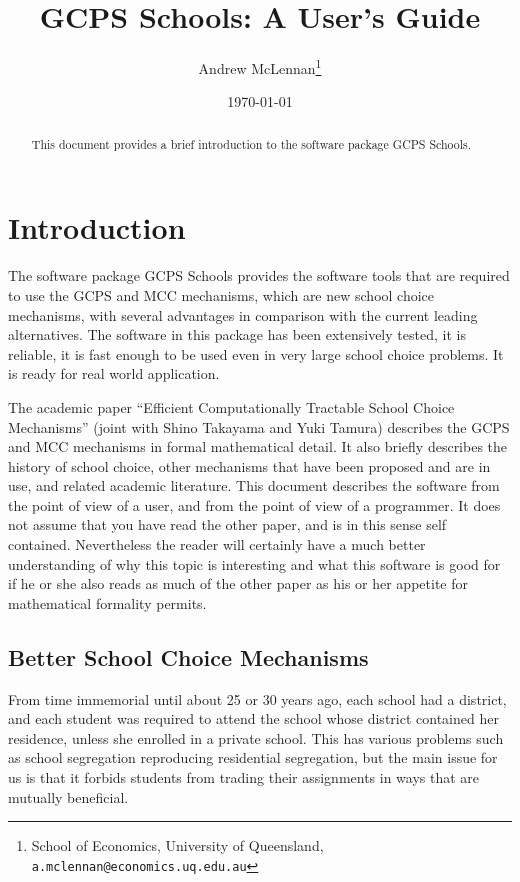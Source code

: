 \documentclass[12pt]{article}
\theoremstyle{definition}
\begin{document}
\title{GCPS Schools: A User's Guide}

\author{Andrew McLennan\footnote{School of Economics, University of
    Queensland, {\tt a.mclennan@economics.uq.edu.au}}}

\date{\today}

\maketitle

\begin{abstract}
This document provides a brief introduction to the software package GCPS Schools.
\end{abstract}


\section{Introduction}

The software package GCPS Schools provides the software tools that are
required to use the GCPS and MCC mechanisms, which are new school choice
mechanisms, with several advantages in comparison with the current
leading alternatives.  The software in this package has been
extensively tested, it is reliable, it is fast enough to be used even
in very large school choice problems.  It is ready for real world
application.

The academic paper ``Efficient Computationally Tractable School Choice
Mechanisms'' (joint with Shino Takayama and Yuki Tamura) describes the
GCPS and MCC mechanisms in formal mathematical detail.  It also
briefly describes the history of school choice, other mechanisms that
have been proposed and are in use, and related academic literature.
This document describes the software from the point of view of a user,
and from the point of view of a programmer.  It does not assume that
you have read the other paper, and is in this sense self contained.
Nevertheless the reader will certainly have a much better
understanding of why this topic is interesting and what this software
is good for if he or she also reads as much of the other paper as his
or her appetite for mathematical formality permits.

\subsection{Better School Choice Mechanisms}

From time immemorial until about 25 or 30 years ago, each school had a
district, and each student was required to attend the school whose
district contained her residence, unless she enrolled in a private
school.  This has various problems such as school segregation
reproducing residential segregation, but the main issue for us is that
it forbids students from trading their assignments in ways that are
mutually beneficial.
\end{document}
